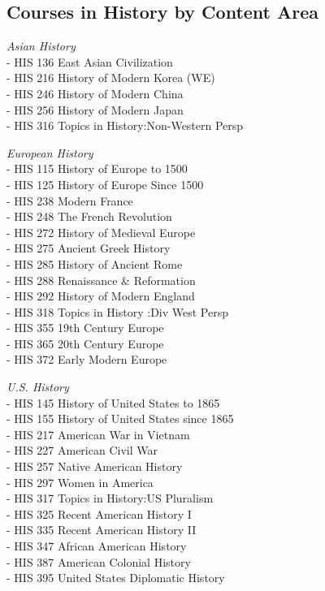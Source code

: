 \documentclass[
  letterpaper,
]{scrbook}
\begin{document}
\subsection{Courses in History by Content
Area}\label{courses-in-history-by-content-area}

\emph{Asian History}\\
- HIS 136 East Asian Civilization\\
- HIS 216 History of Modern Korea (WE)\\
- HIS 246 History of Modern China\\
- HIS 256 History of Modern Japan\\
- HIS 316 Topics in History:Non-Western Persp

\emph{European History}\\
- HIS 115 History of Europe to 1500\\
- HIS 125 History of Europe Since 1500\\
- HIS 238 Modern France\\
- HIS 248 The French Revolution\\
- HIS 272 History of Medieval Europe\\
- HIS 275 Ancient Greek History\\
- HIS 285 History of Ancient Rome\\
- HIS 288 Renaissance \& Reformation\\
- HIS 292 History of Modern England\\
- HIS 318 Topics in History :Div West Persp\\
- HIS 355 19th Century Europe\\
- HIS 365 20th Century Europe\\
- HIS 372 Early Modern Europe

\emph{U.S. History}\\
- HIS 145 History of United States to 1865\\
- HIS 155 History of United States since 1865\\
- HIS 217 American War in Vietnam\\
- HIS 227 American Civil War\\
- HIS 257 Native American History\\
- HIS 297 Women in America\\
- HIS 317 Topics in History:US Pluralism\\
- HIS 325 Recent American History I\\
- HIS 335 Recent American History II\\
- HIS 347 African American History\\
- HIS 387 American Colonial History\\
- HIS 395 United States Diplomatic History
\end{document}
